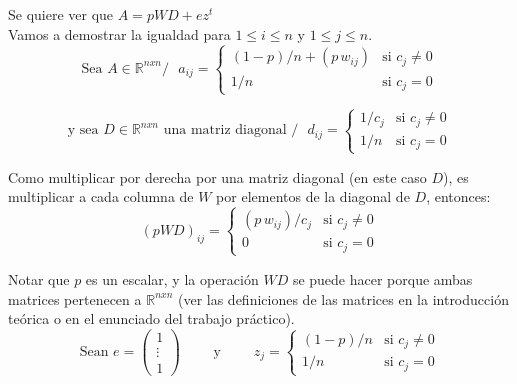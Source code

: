 		Se quiere ver que $A = pWD + e z^{t}$ \\

		Vamos a demostrar la igualdad para $1 \leq i \leq n$ y $1 \leq j \leq n$. \\

		\[ \text{Sea $A \in \mathbb{R}^{nxn} /$ } a_{ij} =
		        \begin{cases}
		                (1-p)/n + (p \, w_{ij})         & \text{si } c_{j}  \neq 0 \\
		                1    /n                         & \text{si } c_{j}   =   0
		        \end{cases}
		\]

		\[ \text{y sea $D \in \mathbb{R}^{nxn}$ una matriz diagonal $/$ } d_{ij} =
		        \begin{cases}
		                1/c_j         & \text{si } c_{j}  \neq 0 \\
		                1/n           & \text{si } c_{j}   =   0
		        \end{cases}
		\]

		Como multiplicar por derecha por una matriz diagonal (en este caso $D$), es multiplicar a cada columna de $W$ por elementos de la diagonal de $D$, entonces: \\

		\[ (pWD)_{ij} =
		        \begin{cases}
		                (p \, w_{ij})/c_j 	& \text{si } c_{j}  \neq 0 \\
		                0 			& \text{si } c_{j}   =   0
		        \end{cases}
		\]

		Notar que $p$ es un escalar, y la operación $WD$ se puede hacer porque ambas matrices pertenecen a $\mathbb{R}^{nxn}$ (ver las definiciones de las matrices en la introducción teórica o en el enunciado del trabajo práctico). \\

		\[ \text{Sean }
		        e       = \begin{pmatrix}
		                        1 \\
		                        \vdots \\
		                        1
		                \end  {pmatrix}
		\qquad
			\text{ y }
		\qquad
			z_{j} = \begin{cases}
		                        (1-p)/n & \text{si } c_{j} \neq 0 \\
		                         1   /n & \text{si } c_{j}   =  0
				\end  {cases}
		\]

